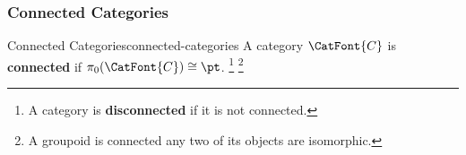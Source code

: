 \subsubsection{Connected Categories}\label{subsubsection-the-quadruple-adjunction-with-sets-connected-categories}
\begin{definition}{Connected Categories}{connected-categories}%
    A category $\CatFont{C}$ is \textbf{connected} if $\pi_{0}(\CatFont{C})\cong\pt$.%
    \footnote{%
        A category is \textbf{disconnected} if it is not connected.
    }%
    \footnote{%
        A groupoid is connected \textiff any two of its objects are isomorphic.
        \par\vspace*{-1.75\baselineskip}
    }%
\end{definition}

